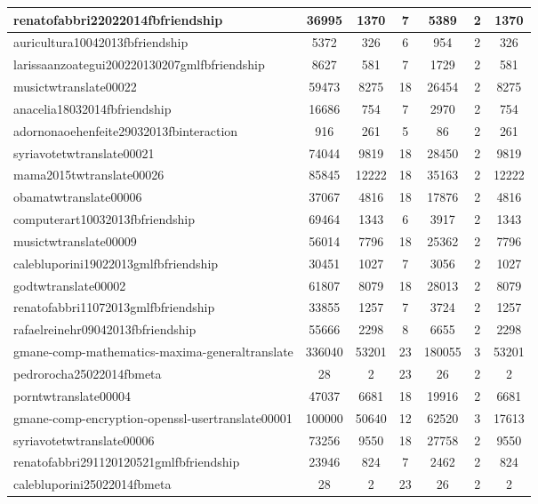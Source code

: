 \begin{table*}[h!]
\begin{center}
\begin{tabular}{| l | c | c | c | c | c | c |}
renatofabbri22022014fbfriendship & 36995  & 1370  & 7  & 5389  & 2  & 1370 \\\hline
auricultura10042013fbfriendship & 5372  & 326  & 6  & 954  & 2  & 326 \\\hline
larissaanzoategui200220130207gmlfbfriendship & 8627  & 581  & 7  & 1729  & 2  & 581 \\\hline
musictwtranslate00022 & 59473  & 8275  & 18  & 26454  & 2  & 8275 \\\hline
anacelia18032014fbfriendship & 16686  & 754  & 7  & 2970  & 2  & 754 \\\hline
adornonaoehenfeite29032013fbinteraction & 916  & 261  & 5  & 86  & 2  & 261 \\\hline
syriavotetwtranslate00021 & 74044  & 9819  & 18  & 28450  & 2  & 9819 \\\hline
mama2015twtranslate00026 & 85845  & 12222  & 18  & 35163  & 2  & 12222 \\\hline
obamatwtranslate00006 & 37067  & 4816  & 18  & 17876  & 2  & 4816 \\\hline
computerart10032013fbfriendship & 69464  & 1343  & 6  & 3917  & 2  & 1343 \\\hline
musictwtranslate00009 & 56014  & 7796  & 18  & 25362  & 2  & 7796 \\\hline
calebluporini19022013gmlfbfriendship & 30451  & 1027  & 7  & 3056  & 2  & 1027 \\\hline
godtwtranslate00002 & 61807  & 8079  & 18  & 28013  & 2  & 8079 \\\hline
renatofabbri11072013gmlfbfriendship & 33855  & 1257  & 7  & 3724  & 2  & 1257 \\\hline
rafaelreinehr09042013fbfriendship & 55666  & 2298  & 8  & 6655  & 2  & 2298 \\\hline
gmane-comp-mathematics-maxima-generaltranslate & 336040  & 53201  & 23  & 180055  & 3  & 53201 \\\hline
pedrorocha25022014fbmeta & 28  & 2  & 23  & 26  & 2  & 2 \\\hline
porntwtranslate00004 & 47037  & 6681  & 18  & 19916  & 2  & 6681 \\\hline
gmane-comp-encryption-openssl-usertranslate00001 & 100000  & 50640  & 12  & 62520  & 3  & 17613 \\\hline
syriavotetwtranslate00006 & 73256  & 9550  & 18  & 27758  & 2  & 9550 \\\hline
renatofabbri291120120521gmlfbfriendship & 23946  & 824  & 7  & 2462  & 2  & 824 \\\hline
calebluporini25022014fbmeta & 28  & 2  & 23  & 26  & 2  & 2 \\\hline

\end{tabular}
\end{center}
\end{table*}
